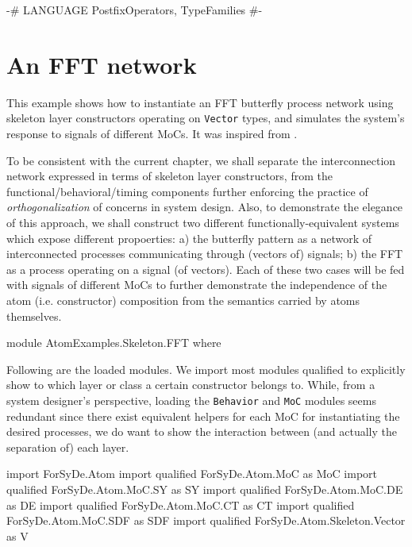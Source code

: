 \begin{code}
{-# LANGUAGE PostfixOperators, TypeFamilies  #-}  
\end{code}

\section{An FFT network}
\label{sec:an-fft-network}

This example shows how to instantiate an FFT butterfly process network using skeleton layer constructors operating on \texttt{Vector} types, and simulates the system's response to signals of different MoCs.  It was inspired from \cite{reekie95}.

To be consistent with the current chapter, we shall separate the interconnection network expressed in terms of skeleton layer constructors, from the functional/behavioral/timing components further enforcing the practice of \emph{orthogonalization} of concerns in system design. Also, to demonstrate the elegance of this approach, we shall construct two different functionally-equivalent systems which expose different propoerties: a) the butterfly pattern as a network of interconnected processes communicating through (vectors of) signals; b) the FFT as a process operating on a signal (of vectors). Each of these two cases will be fed with signals of different MoCs to further demonstrate the independence of the atom (i.e. constructor) composition from the semantics carried by atoms themselves.

\begin{code}
module AtomExamples.Skeleton.FFT where
\end{code}

Following are the loaded modules. We import most modules qualified to explicitly show to which layer or class a certain constructor belongs to. While, from a system designer's perspective, loading the \texttt{Behavior} and \texttt{MoC} modules seems redundant since there exist equivalent helpers for each MoC for instantiating the desired processes, we do want to show the interaction between (and actually the separation of) each layer. 

\begin{code}
import           ForSyDe.Atom
import qualified ForSyDe.Atom.MoC             as MoC
import qualified ForSyDe.Atom.MoC.SY          as SY  
import qualified ForSyDe.Atom.MoC.DE          as DE  
import qualified ForSyDe.Atom.MoC.CT          as CT  
import qualified ForSyDe.Atom.MoC.SDF         as SDF
import qualified ForSyDe.Atom.Skeleton.Vector as V
\end{code}

